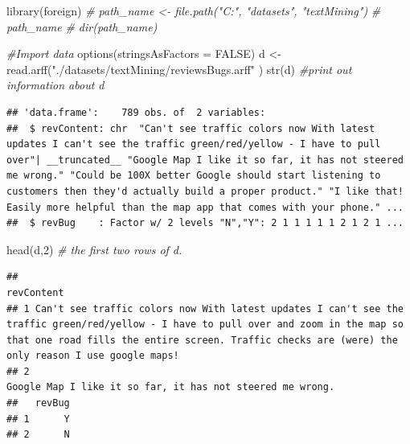 \documentclass[
]{book}
\newenvironment{Shaded}{\begin{snugshade}}{\end{snugshade}}
\newcommand{\AttributeTok}[1]{\textcolor[rgb]{0.77,0.63,0.00}{#1}}
\newcommand{\CommentTok}[1]{\textcolor[rgb]{0.56,0.35,0.01}{\textit{#1}}}
\newcommand{\ConstantTok}[1]{\textcolor[rgb]{0.00,0.00,0.00}{#1}}
\newcommand{\DecValTok}[1]{\textcolor[rgb]{0.00,0.00,0.81}{#1}}
\newcommand{\FunctionTok}[1]{\textcolor[rgb]{0.00,0.00,0.00}{#1}}
\newcommand{\NormalTok}[1]{#1}
\newcommand{\OtherTok}[1]{\textcolor[rgb]{0.56,0.35,0.01}{#1}}
\newcommand{\StringTok}[1]{\textcolor[rgb]{0.31,0.60,0.02}{#1}}
\begin{document}
\begin{Shaded}
\begin{Highlighting}[]
\FunctionTok{library}\NormalTok{(foreign)}
\CommentTok{\# path\_name \textless{}{-} file.path("C:", "datasets", "textMining")}
\CommentTok{\# path\_name}
\CommentTok{\# dir(path\_name)}

\CommentTok{\#Import data}
\FunctionTok{options}\NormalTok{(}\AttributeTok{stringsAsFactors =} \ConstantTok{FALSE}\NormalTok{)}
\NormalTok{d }\OtherTok{\textless{}{-}} \FunctionTok{read.arff}\NormalTok{(}\StringTok{"./datasets/textMining/reviewsBugs.arff"}\NormalTok{ )}
\FunctionTok{str}\NormalTok{(d) }\CommentTok{\#print out information about d}
\end{Highlighting}
\end{Shaded}

\begin{verbatim}
## 'data.frame':    789 obs. of  2 variables:
##  $ revContent: chr  "Can't see traffic colors now With latest updates I can't see the traffic green/red/yellow - I have to pull over"| __truncated__ "Google Map I like it so far, it has not steered me wrong." "Could be 100X better Google should start listening to customers then they'd actually build a proper product." "I like that! Easily more helpful than the map app that comes with your phone." ...
##  $ revBug    : Factor w/ 2 levels "N","Y": 2 1 1 1 1 1 2 1 2 1 ...
\end{verbatim}

\begin{Shaded}
\begin{Highlighting}[]
\FunctionTok{head}\NormalTok{(d,}\DecValTok{2}\NormalTok{) }\CommentTok{\# the first two rows of d. }
\end{Highlighting}
\end{Shaded}

\begin{verbatim}
##                                                                                                                                                                                                                                   revContent
## 1 Can't see traffic colors now With latest updates I can't see the traffic green/red/yellow - I have to pull over and zoom in the map so that one road fills the entire screen. Traffic checks are (were) the only reason I use google maps!
## 2                                                                                                                                                                                  Google Map I like it so far, it has not steered me wrong.
##   revBug
## 1      Y
## 2      N
\end{verbatim}
\end{document}
